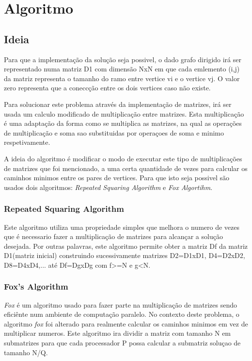 \documentclass[12pt,a4paper]{article}
\begin{document}
\section{Algoritmo}
        \subsection{Ideia}
            Para que a implementação da solução seja possivel, o dado grafo dirigido irá ser representado numa matriz D1 com dimensão NxN em que cada emlemento (i,j) da matriz representa o tamanho do ramo entre vertice vi e o vertice vj. O valor zero representa que a coneccção entre os dois vertices caso não existe.
            
            Para solucionar este problema através da implementação de matrizes, irá ser usada um calculo modificado de multiplicação entre matrizes. Esta multiplicação é uma adaptação da forma como se multiplica as matrizes, na qual as operações de multiplicação e soma sao substituidas por operaçoes de soma e minimo respetivamente.
        
            A ideia do algoritmo é modificar o modo de executar este tipo de multiplicações de matrizes que foi mencionado, a uma certa quantidade de vezes para calcular os caminhos minimos entre os pares de vertices. Para que isto seja possivel são usados dois algoritmos: \textit{Repeated Squaring Algorithm} e \textit{Fox Algortihm}.
            
            \subsubsection{Repeated Squaring Algorithm}
                Este algoritmo utiliza uma propriedade simples que melhora o numero de vezes que é necessario fazer a multiplicação de matrizes para alcançar a solução desejada. Por outras palavras, este algoritmo permite obter a matriz Df da matriz D1(matriz inicial) construindo sucessivamente matrizes D2=D1xD1, D4=D2xD2, D8=D4xD4,... até Df=DgxDg com f>=N e g<N.
                
                
            \subsubsection{Fox's Algorithm}
                \textit{Fox} é um algoritmo usado para fazer parte na multiplicação de matrizes sendo eficiênte num ambiente de computação paralelo. No contexto deste problema, o algoritmo \textit{fox} foi alterado para realmente calcular os caminhos minimos em vez de multiplicar numeros. Este algoritmo ira dividir a matriz com tamanho N em submatrizes para que cada processador P possa calcular a submatriz soluçao de tamanho N/Q.  
                
\end{document}
